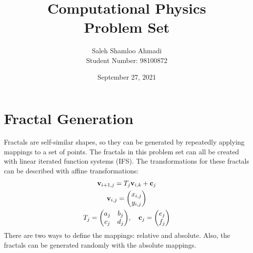 \documentclass[12pt,a4paper]{article}
\title{Computational Physics\\Problem Set}
\author{Saleh Shamloo Ahmadi\\Student Number: 98100872}
\date{September 27, 2021}
\begin{document}
	\maketitle
    \section{Fractal Generation}
    Fractals are self-similar shapes, so they can be generated by repeatedly applying mappings to a set of points.
    The fractals in this problem set can all be created with linear iterated function systems (IFS).
    The transformations for these fractals can be described with affine transformations:
    \begin{gather}
        \vb{v}_{i+1, j} = T_j\vb{v}_{i, k} + \vb{c}_j\\
        \vb{v}_{i, j} = \mqty(x_{i,j} \\ y_{i,j}) \\
        T_j = \mqty(a_j & b_j \\ c_j & d_j),\quad \vb{c}_j = \mqty(e_j \\ f_j)
    \end{gather}
    There are two ways to define the mappings: relative and absolute. Also, the fractals can be generated randomly
    with the absolute mappings.
\end{document}
